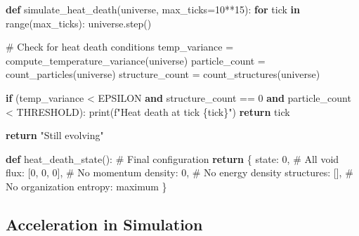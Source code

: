 \documentclass[
  11pt,
  letterpaper,
  twoside,
  openright]{book}
\newenvironment{Shaded}{\begin{snugshade}}{\end{snugshade}}
\newcommand{\BuiltInTok}[1]{\textcolor[rgb]{0.00,0.23,0.31}{#1}}
\newcommand{\CommentTok}[1]{\textcolor[rgb]{0.37,0.37,0.37}{#1}}
\newcommand{\ControlFlowTok}[1]{\textcolor[rgb]{0.00,0.23,0.31}{\textbf{#1}}}
\newcommand{\DecValTok}[1]{\textcolor[rgb]{0.68,0.00,0.00}{#1}}
\newcommand{\KeywordTok}[1]{\textcolor[rgb]{0.00,0.23,0.31}{\textbf{#1}}}
\newcommand{\NormalTok}[1]{\textcolor[rgb]{0.00,0.23,0.31}{#1}}
\newcommand{\OperatorTok}[1]{\textcolor[rgb]{0.37,0.37,0.37}{#1}}
\newcommand{\SpecialCharTok}[1]{\textcolor[rgb]{0.37,0.37,0.37}{#1}}
\newcommand{\SpecialStringTok}[1]{\textcolor[rgb]{0.13,0.47,0.30}{#1}}
\newcommand{\StringTok}[1]{\textcolor[rgb]{0.13,0.47,0.30}{#1}}
\begin{document}
\begin{Shaded}
\begin{Highlighting}[]
\KeywordTok{def}\NormalTok{ simulate\_heat\_death(universe, max\_ticks}\OperatorTok{=}\DecValTok{10}\OperatorTok{**}\DecValTok{15}\NormalTok{):}
    \ControlFlowTok{for}\NormalTok{ tick }\KeywordTok{in} \BuiltInTok{range}\NormalTok{(max\_ticks):}
\NormalTok{        universe.step()}

        \CommentTok{\# Check for heat death conditions}
\NormalTok{        temp\_variance }\OperatorTok{=}\NormalTok{ compute\_temperature\_variance(universe)}
\NormalTok{        particle\_count }\OperatorTok{=}\NormalTok{ count\_particles(universe)}
\NormalTok{        structure\_count }\OperatorTok{=}\NormalTok{ count\_structures(universe)}

        \ControlFlowTok{if}\NormalTok{ (temp\_variance }\OperatorTok{\textless{}}\NormalTok{ EPSILON }\KeywordTok{and}
\NormalTok{            structure\_count }\OperatorTok{==} \DecValTok{0} \KeywordTok{and}
\NormalTok{            particle\_count }\OperatorTok{\textless{}}\NormalTok{ THRESHOLD):}
            \BuiltInTok{print}\NormalTok{(}\SpecialStringTok{f"Heat death at tick }\SpecialCharTok{\{}\NormalTok{tick}\SpecialCharTok{\}}\SpecialStringTok{"}\NormalTok{)}
            \ControlFlowTok{return}\NormalTok{ tick}

    \ControlFlowTok{return} \StringTok{"Still evolving"}

\KeywordTok{def}\NormalTok{ heat\_death\_state():}
    \CommentTok{\# Final configuration}
    \ControlFlowTok{return}\NormalTok{ \{}
        \StringTok{\textquotesingle{}state\textquotesingle{}}\NormalTok{: }\DecValTok{0}\NormalTok{,  }\CommentTok{\# All void}
        \StringTok{\textquotesingle{}flux\textquotesingle{}}\NormalTok{: [}\DecValTok{0}\NormalTok{, }\DecValTok{0}\NormalTok{, }\DecValTok{0}\NormalTok{],  }\CommentTok{\# No momentum}
        \StringTok{\textquotesingle{}density\textquotesingle{}}\NormalTok{: }\DecValTok{0}\NormalTok{,  }\CommentTok{\# No energy density}
        \StringTok{\textquotesingle{}structures\textquotesingle{}}\NormalTok{: [],  }\CommentTok{\# No organization}
        \StringTok{\textquotesingle{}entropy\textquotesingle{}}\NormalTok{: }\StringTok{\textquotesingle{}maximum\textquotesingle{}}
\NormalTok{    \}}
\end{Highlighting}
\end{Shaded}

\subsection{Acceleration in
Simulation}\label{acceleration-in-simulation}
\end{document}
